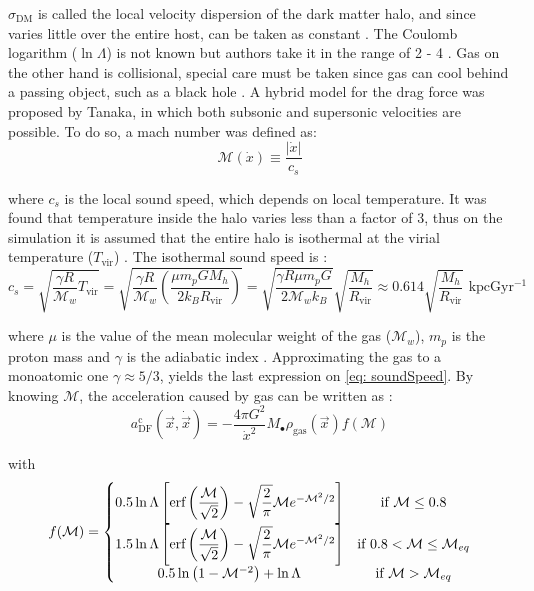 			$\sigma_\text{DM}$ is called the local velocity dispersion of the dark matter halo, and since varies little over the entire host, can be taken as constant \cite{tanaka2009assembly, choksi2017recoiling}. The Coulomb logarithm ($\ln\Lambda$) is not known but authors take it in the range of 2 - 4 \cite{choksi2017recoiling}. Gas on the other hand is collisional, special care must be taken since gas can cool behind a passing object, such as a black hole \cite{choksi2017recoiling}. A hybrid model for the drag force was proposed by Tanaka, in which both subsonic and supersonic velocities are possible. To do so, a mach number was defined as:
			\begin{equation}
				\mathcal{M}(\dot{x}) \equiv \dfrac{|\dot{x}|}{c_s}
			\end{equation}
			
			where $c_s$ is the local sound speed, which depends on local temperature. It was found that temperature inside the halo varies less than a factor of 3, thus on the simulation it is assumed that the entire halo is isothermal at the virial temperature ($T_\text{vir}$) \cite{choksi2017recoiling}. The isothermal sound speed is \cite{barkana2001beginning}:
			\begin{equation}\label{eq: soundSpeed}
				c_s = \sqrt{\dfrac{\gamma R}{\mathcal{M}_w}T_\text{vir}} = \sqrt{\dfrac{\gamma R}{\mathcal{M}_w}\left(\dfrac{\mu m_p G M_h}{2k_BR_\text{vir}}\right)} = \sqrt{\dfrac{\gamma R\mu m_pG}{2\mathcal{M}_wk_B}} \sqrt{\dfrac{M_h}{R_\text{vir}}} \approx 0.614 \sqrt{\dfrac{M_h}{R_\text{vir}}}\text{ kpcGyr$^{-1}$}
			\end{equation}
			
			where $\mu$ is the value of the mean molecular weight of the gas ($\mathcal{M}_w$), $m_p$ is the proton mass and $\gamma$ is the adiabatic index \cite{barkana2001beginning}. Approximating the gas to a monoatomic one $\gamma \approx 5/3$, yields the last expression on \autoref{eq: soundSpeed}. By knowing $\mathcal{M}$, the acceleration caused by gas can be written as \cite{tanaka2009assembly, choksi2017recoiling}:
			\begin{equation}
				a^\text{c}_\text{DF}(\vec{x}, \dot{\vec{x}}) = -\dfrac{4\pi G^2}{\dot{x}^2}M_\bullet\rho_\text{gas}(\vec{x})f(\mathcal{M})
			\end{equation}
			
			with
			\begin{equation}
				f(\mathcal{M}) = \left\{
				\begin{matrix}
				0.5\ln\Lambda \left[\text{erf}\left(\dfrac{\mathcal{M}}{\sqrt{2}}\right) - \sqrt{\dfrac{2}{\pi}}\mathcal{M}e^{-\mathcal{M}^2/2}\right]& \text{if $\mathcal{M} \leq 0.8$}\\
				1.5\ln\Lambda \left[\text{erf}\left(\dfrac{\mathcal{M}}{\sqrt{2}}\right) - \sqrt{\dfrac{2}{\pi}}\mathcal{M}e^{-\mathcal{M}^2/2}\right] & \text{if $0.8 < \mathcal{M} \leq \mathcal{M}_{eq}$}\\
				0.5\ln\left(1 - \mathcal{M}^{-2}\right) + \ln\Lambda & \text{if $\mathcal{M} > \mathcal{M}_{eq}$}
				\end{matrix}
				\right.
			\end{equation}
			
